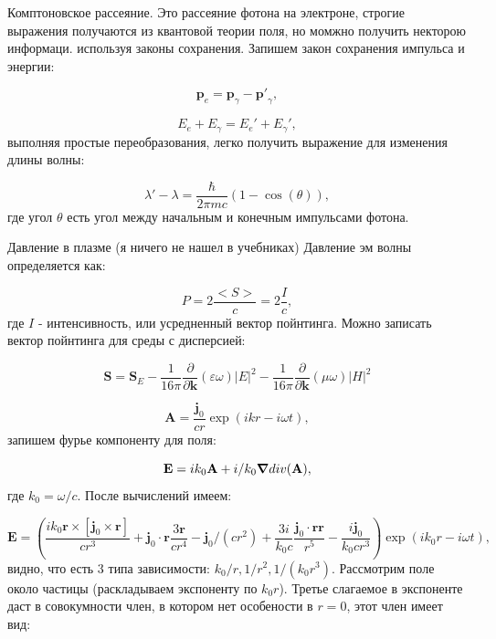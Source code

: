 \documentclass[10pt, a4paper]{article}
\numberwithin{equation}{section}
\begin{document}
Комптоновское рассеяние.
Это рассеяние фотона на электроне, строгие выражения получаются из квантовой теории поля, но момжно получить
некторою информаци. используя законы сохранения. Запишем закон сохранения импульса и энергии:

\begin{equation}
    \mathbf{p}_e=\mathbf{p}_{\gamma}-\mathbf{p'}_{\gamma},
\end{equation}

\begin{equation}
    E_e + E_{\gamma}=E_e' +E_{\gamma}',
\end{equation}
выполняя простые переобразования, легко получить выражение для изменения длины волны:

\begin{equation}
    \lambda'-\lambda=\frac{\hbar}{2\pi mc} (1-\cos(\theta)),
\end{equation}
где угол $\theta$ есть угол между начальным и конечным импульсами фотона.

Давление в плазме (я ничего не нашел  в учебниках)
Давление эм волны определяется как:

\begin{equation}
    P = 2\frac{<S>}{c} = 2\frac{I}{c},
\end{equation}
где $I$ - интенсивность, или усредненный вектор пойнтинга. Можно записать вектор пойнтинга для среды с дисперсией:

\begin{equation}
    \mathbf{S}=\mathbf{S}_E-\frac{1}{16\pi}\frac{\partial}{\partial\mathbf{k}}(\varepsilon\omega)|E|^2-\frac{1}{16\pi}\frac{\partial}{\partial\mathbf{k}}(\mu\omega)|H|^2
\end{equation}


\begin{equation}
    \mathbf{A}=\frac{\mathbf{j}_0}{cr} \exp(ikr - i\omega t),
\end{equation}
запишем фурье компоненту для поля: 

\begin{equation}
    \mathbf{E}=ik_0\mathbf{A}+i/k_0 \grad div(\mathbf{A}),
\end{equation}
где $k_0=\omega/c$. После вычислений имеем:

\begin{equation}
    \mathbf{E}=\left( 
    \frac{ik_0\mathbf{r}\times[\mathbf{j}_0\times \mathbf{r}]}{cr^3} +
    \mathbf{j}_0\cdot\mathbf{r}\frac{3\mathbf{r}}{cr^4} - \mathbf{j}_0/(cr^2) +
    \frac{3i}{k_0c}\frac{\mathbf{j}_0\cdot\mathbf{r} \mathbf{r}}{r^5} - \frac{i\mathbf{j}_0}{k_0 cr^3}
              \right) \exp(ik_0r-i\omega t),
\end{equation}
видно, что есть 3 типа зависимости: $k_0/r, 1/r^2, 1/(k_0r^3)$. Рассмотрим поле около частицы (раскладываем экспоненту
по $k_0r$). Третье слагаемое в экспоненте даст в совокумности член, в котором нет особености в $r=0$, этот член 
имеет вид:
\end{document}
